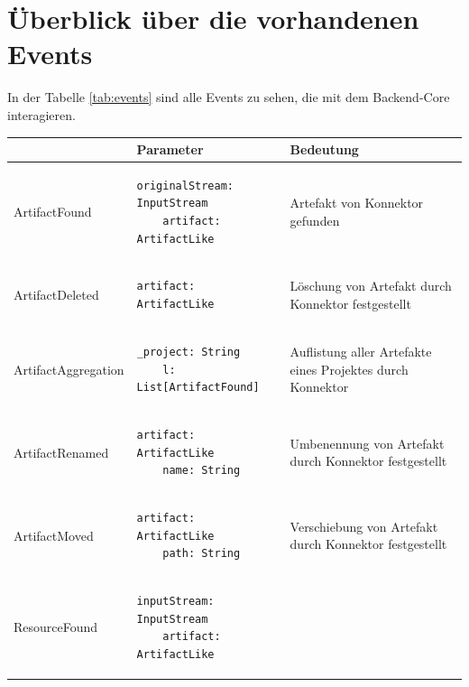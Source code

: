 \section{Überblick über die vorhandenen Events}
\label{event-overiview}
In der Tabelle \ref{tab:events} sind alle Events zu sehen, die mit dem Backend-Core interagieren.

\begin{table}
    \begin{tabular}{|l|l|p{4.8cm}|}
    \hline
    ~                   & Parameter                                                                & Bedeutung                                                  \\ \hline
    ArtifactFound       & \begin{lstlisting}[gobble=4] 
    originalStream: InputStream
    artifact: ArtifactLike
    \end{lstlisting}                      & Artefakt von Konnektor gefunden                            \\ \hline
    ArtifactDeleted     & \begin{lstlisting}[gobble=4]
    artifact: ArtifactLike
    \end{lstlisting}                                                   & Löschung von Artefakt durch Konnektor festgestellt         \\ \hline
    ArtifactAggregation & \begin{lstlisting}[gobble=4]
    _project: String
    l: List[ArtifactFound]
    \end{lstlisting}                                 & Auflistung aller Artefakte eines Projektes durch Konnektor \\ \hline
    ArtifactRenamed     & \begin{lstlisting}[gobble=4]
    artifact: ArtifactLike
    name: String
    \end{lstlisting}                                     & Umbenennung von Artefakt durch Konnektor festgestellt      \\ \hline
    ArtifactMoved       & \begin{lstlisting}[gobble=4]
    artifact: ArtifactLike
    path: String
    \end{lstlisting}                                     & Verschiebung von Artefakt durch Konnektor festgestellt     \\ \hline
    ResourceFound       & \begin{lstlisting}[gobble=4]
    inputStream: InputStream
    artifact: ArtifactLike

\end{lstlisting}
\end{tabular}
\end{table}
